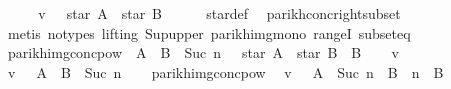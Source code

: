\begin{isabellebody}
\ \ \isamarkupfalse%
\ \isamarkupfalse%
\ {\isachardoublequoteopen}v\ {\isasymin}\ {\isasymPsi}\ {\isacharparenleft}{\kern0pt}star\ A\ {\isacharat}{\kern0pt}{\isacharat}{\kern0pt}\ star\ B{\isacharparenright}{\kern0pt}{\isachardoublequoteclose}\isanewline
\ \ \ \ \isamarkupfalse%
\ star{\isacharunderscore}{\kern0pt}def\ \isamarkupfalse%
\ parikh{\isacharunderscore}{\kern0pt}conc{\isacharunderscore}{\kern0pt}right{\isacharunderscore}{\kern0pt}subset\isanewline
\ \ \ \ \isamarkupfalse%
\ {\isacharparenleft}{\kern0pt}metis\ {\isacharparenleft}{\kern0pt}no{\isacharunderscore}{\kern0pt}types{\isacharcomma}{\kern0pt}\ lifting{\isacharparenright}{\kern0pt}\ Sup{\isacharunderscore}{\kern0pt}upper\ parikh{\isacharunderscore}{\kern0pt}img{\isacharunderscore}{\kern0pt}mono\ rangeI\ subset{\isacharunderscore}{\kern0pt}eq{\isacharparenright}{\kern0pt}\isanewline
{}\isamarkupfalse%
%
\endisatagproof
{\isafoldproof}%
%
\isadelimproof
\isanewline
%
\endisadelimproof
\isanewline
{}\isamarkupfalse%
\ parikh{\isacharunderscore}{\kern0pt}img{\isacharunderscore}{\kern0pt}conc{\isacharunderscore}{\kern0pt}pow{}{\isacharcolon}{\kern0pt}\ {\isachardoublequoteopen}{\isasymPsi}\ {\isacharparenleft}{\kern0pt}{\isacharparenleft}{\kern0pt}A\ {\isacharat}{\kern0pt}{\isacharat}{\kern0pt}\ B{\isacharparenright}{\kern0pt}\ {\isacharcircum}{\kern0pt}{\isacharcircum}{\kern0pt}\ Suc\ n{\isacharparenright}{\kern0pt}\ {\isasymsubseteq}\ {\isasymPsi}\ {\isacharparenleft}{\kern0pt}star\ A\ {\isacharat}{\kern0pt}{\isacharat}{\kern0pt}\ star\ B\ {\isacharat}{\kern0pt}{\isacharat}{\kern0pt}\ B{\isacharparenright}{\kern0pt}{\isachardoublequoteclose}\isanewline
%
\isadelimproof
%
\endisadelimproof
%
\isatagproof
{}\isamarkupfalse%
\isanewline
\ \ \isamarkupfalse%
\ v\isanewline
\ \ \isamarkupfalse%
\ {\isachardoublequoteopen}v\ {\isasymin}\ {\isasymPsi}\ {\isacharparenleft}{\kern0pt}{\isacharparenleft}{\kern0pt}A\ {\isacharat}{\kern0pt}{\isacharat}{\kern0pt}\ B{\isacharparenright}{\kern0pt}\ {\isacharcircum}{\kern0pt}{\isacharcircum}{\kern0pt}\ Suc\ n{\isacharparenright}{\kern0pt}{\isachardoublequoteclose}\isanewline
\ \ \isamarkupfalse%
\ parikh{\isacharunderscore}{\kern0pt}img{\isacharunderscore}{\kern0pt}conc{\isacharunderscore}{\kern0pt}pow\ \isamarkupfalse%
\ {\isachardoublequoteopen}v\ {\isasymin}\ {\isasymPsi}\ {\isacharparenleft}{\kern0pt}A\ {\isacharcircum}{\kern0pt}{\isacharcircum}{\kern0pt}\ Suc\ n\ {\isacharat}{\kern0pt}{\isacharat}{\kern0pt}\ B\ {\isacharcircum}{\kern0pt}{\isacharcircum}{\kern0pt}\ n\ {\isacharat}{\kern0pt}{\isacharat}{\kern0pt}\ B{\isacharparenright}{\kern0pt}{\isachardoublequoteclose}\isanewline

\end{isabellebody}
